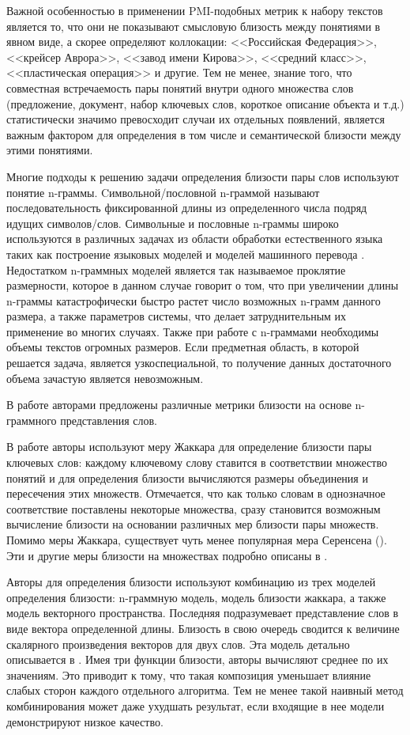 Важной особенностью в применении PMI-подобных метрик к набору текстов является то, что они не показывают смысловую близость между понятиями в явном виде, а скорее определяют коллокации: <<Российская Федерация>>, <<крейсер Аврора>>, <<завод имени Кирова>>, <<средний класс>>, <<пластическая операция>> и другие. Тем не менее, знание того, что совместная встречаемость пары понятий внутри одного множества слов (предложение, документ, набор ключевых слов, короткое описание объекта и т.д.) статистически значимо превосходит случаи их отдельных появлений, является важным фактором для определения в том числе и семантической близости между этими понятиями.

Многие подходы к решению задачи определения близости пары слов используют понятие n-граммы.
Cимвольной/пословной n-граммой называют последовательность фиксированной длины из определенного числа подряд идущих символов/слов. Символьные и пословные n-граммы широко используются в различных задачах из области обработки естественного языка таких как построение языковых моделей \cite{ngrams_1,ngrams_2,ngrams_3,ngrams_4} и моделей машинного перевода \cite{ngrams_mt_1,ngrams_mt_2,ngrams_mt_3}. Недостатком n-граммных моделей является так называемое проклятие размерности, которое в данном случае говорит о том, что при увеличении длины n-граммы катастрофически быстро растет число возможных n-грамм данного размера, а также параметров системы, что делает затруднительным их применение во многих случаях. Также при работе с n-граммами необходимы объемы текстов огромных размеров. Если предметная область, в которой решается задача, является узкоспециальной, то получение данных достаточного объема зачастую является невозможным.

В работе \cite{ngrams_sim} авторами предложены различные метрики близости на основе n-граммного представления слов.

В работе \cite{Albatineh2011} авторы используют  меру Жаккара для определение близости пары ключевых слов: каждому ключевому слову ставится в соответствии множество понятий и для определения близости вычисляются размеры объединения и пересечения этих множеств. Отмечается, что как только словам в однозначное соответствие поставлены некоторые множества, сразу становится возможным вычисление близости на основании различных мер близости пары множеств. Помимо меры Жаккара, существует чуть менее популярная мера Серенсена (\cite{dice_1}). Эти и другие меры близости на множествах подробно описаны в \cite{dist_between_sets}.

Авторы \cite{Shirude} для определения близости используют комбинацию из трех моделей определения близости: n-граммную модель, модель близости жаккара, а также модель векторного пространства. Последняя подразумевает представление слов в виде вектора определенной длины. Близость в свою очередь сводится к величине скалярного произведения векторов для двух слов. Эта модель детально описывается в \cite{vector_space}. Имея три функции близости, авторы вычисляют среднее по их значениям. Это приводит к тому, что такая композиция уменьшает влияние слабых сторон каждого отдельного алгоритма. Тем не менее такой наивный метод комбинирования может даже ухудшать результат, если входящие в нее модели демонстрируют низкое качество.


